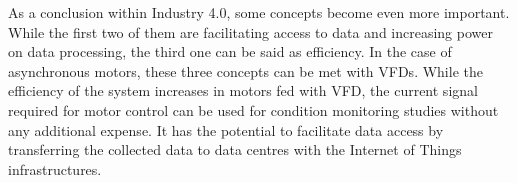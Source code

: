 As a conclusion within Industry 4.0, some concepts become even more important. While the first two of them are facilitating access to data and increasing power on data processing, the third one can be said as efficiency. In the case of asynchronous motors, these three concepts can be met with VFDs. While the efficiency of the system increases in motors fed with VFD, the current signal required for motor control can be used for condition monitoring studies without any additional expense. It has the potential to facilitate data access by transferring the collected data to data centres with the Internet of Things infrastructures.